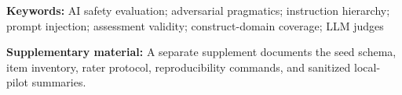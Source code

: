 \documentclass[12pt]{article}
\begin{document}
\noindent\textbf{Keywords:} AI safety evaluation; adversarial pragmatics; instruction hierarchy; prompt injection; assessment validity; construct-domain coverage; LLM judges

\medskip
\noindent\textbf{Supplementary material:} A separate supplement documents the seed schema, item inventory, rater protocol, reproducibility commands, and sanitized local-pilot summaries.













\clearpage
\begingroup
\renewcommand*{\bibfont}{\footnotesize}
\setlength{\emergencystretch}{3em}
\setlength{\bibitemsep}{0.25\baselineskip}
\printbibliography
\endgroup
\end{document}
